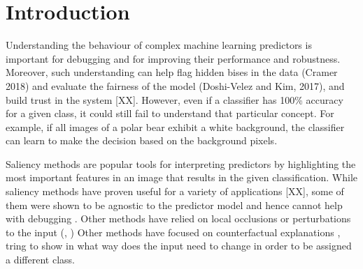 \documentclass{article}
\begin{document}

\begin{abstract}
 
\end{abstract}

\section{Introduction}

Understanding the behaviour of complex machine learning predictors is important for debugging and for improving their performance and robustness. Moreover, such understanding can help flag hidden bises in the data (Cramer 2018) and evaluate the fairness of the model (Doshi-Velez and Kim, 2017), and build trust in the system [XX]. However, even if a classifier has 100\% accuracy for a given class, it could still fail to understand that particular concept. For example, if all images of a polar bear exhibit a white background, the classifier can learn to make the decision based on the background pixels. 

Saliency methods \cite{simonyan2013deep,springenberg2014striving,selvaraju2016grad,smilkov2017smoothgrad} are popular tools for interpreting predictors by highlighting the most important features in an image that results in the given classification. While saliency methods have proven useful for a variety of applications [XX], some of them were shown to be agnostic to the predictor model and hence cannot help with debugging \cite{adebayo2018sanity}. Other methods have relied on local occlusions or perturbations to the input (\cite{zhou2014object}, \cite{fong2017interpretable}) Other methods have focused on counterfactual explanations \cite{wachter2017counterfactual,goyal2019counterfactual}, tring to show in what way does the input need to change in order to be assigned a different class. 
\end{document}
